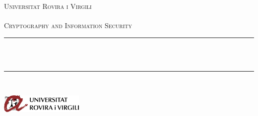 \begin{titlepage}
  	\newcommand{\HRule}{\rule{\linewidth}{0.3mm}} %
	\center %
	
	\textsc{\LARGE Universitat Rovira i Virgili}\\[1.5cm]
	
	\textsc{\Large \deliverableName}\\[0.5cm]
	
	\textsc{\large Cryptography and Information Security}\\[0.5cm]
	
	
	\HRule\\[0.4cm]
	
	{\huge\bfseries \@title}\\[0.4cm]
	
	\HRule\\[1.5cm]
	

 	{\large\sc\@author} %
	
	
	\vfill\vfill
		{\large\@date} %
    \vfill\vfill\vfill
	
    
	
	\vfill
	\includegraphics[width=0.3\textwidth]{./urvlogo.png}
	\vfill
	 
	
\end{titlepage}
